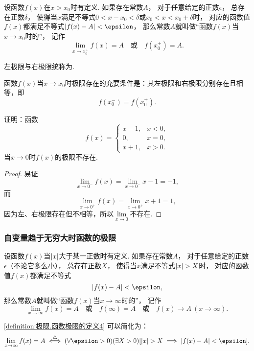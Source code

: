 \begin{definition}\label{definition:极限.函数极限的定义3}
设函数\(f(x)\)在\(x > x_0\)时有定义.
如果存在常数\(A\)，
对于任意给定的正数\(\epsilon\)，
总存在正数\(\delta\)，
使得当\(x\)满足不等式\(0 < x - x_0 < \delta\)或\(x_0 < x < x_0 + \delta\)时，
对应的函数值\(f(x)\)都满足不等式\(\abs{f(x) - A} < \epsilon\)，
那么常数\(A\)就叫做“函数\(f(x)\)当\(x \to x_0\)时的”，
记作\[
\lim\limits_{x \to x_0^+} f(x) = A
\quad\text{或}\quad
f(x_0^+) = A.
\]
\end{definition}
左极限与右极限统称为.

\begin{theorem}
函数\(f(x)\)当\(x \to x_0\)时极限存在的充要条件是：其左极限和右极限分别存在且相等，即\[
f(x_0^-) = f(x_0^+).
\]
\end{theorem}

\begin{example}
证明：函数\[
f(x) = \left\{ \begin{array}{lc}
x-1, & x<0, \\
0, & x=0, \\
x+1, & x>0.
\end{array} \right.
\]当\(x\to0\)时\(f(x)\)的极限不存在.
\begin{proof}
易证\[
\lim\limits_{x\to0^-} f(x) = \lim\limits_{x\to0^-} x-1 = -1,
\]而\[
\lim\limits_{x\to0^+} f(x) = \lim\limits_{x\to0^+} x+1 = 1,
\]因为左、右极限存在但不相等，所以\(\lim\limits_{x\to0}\)不存在.
\end{proof}
\end{example}

\subsubsection*{自变量趋于无穷大时函数的极限}
\begin{definition}\label{definition:极限.函数极限的定义4}
设函数\(f(x)\)当\(\abs{x}\)大于某一正数时有定义.
如果存在常数\(A\)，
对于任意给定的正数\(\epsilon\)（不论它多么小），
总存在正数\(X\)，
使得当\(x\)满足不等式\(\abs{x} > X\)时，
对应的函数值\(f(x)\)都满足不等式\[
\abs{f(x) - A} < \epsilon,
\]那么常数\(A\)就叫做“函数\(f(x)\)当\(x \to \infty\)时的”，
记作\[
\lim\limits_{x \to \infty} f(x) = A
\quad\text{或}\quad
f(\infty) = A
\quad\text{或}\quad
f(x) \to A\ (x \to \infty).
\]
\end{definition}
\cref{definition:极限.函数极限的定义4} 可以简化为：
\[
	\lim\limits_{x\to\infty} f(x) = A
	\defiff
	(\forall\epsilon>0)
	(\exists X>0)
	[
		\abs{x} > X
		\implies
		\abs{f(x) - A} < \epsilon
	].
\]

